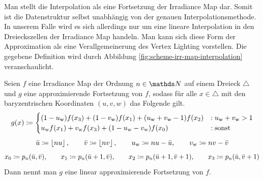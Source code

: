 		Man stellt die Interpolation als eine Fortsetzung der Irradiance Map dar.
		Somit ist die Datenstruktur selbst unabhängig von der genauen Interpolationsmethode.
		In unserem Falle wird es sich allerdings nur um eine lineare Interpolation in den Dreieckszellen der Irradiance Map handeln.
		Man kann sich diese Form der Approximation als eine Verallgemeinerung des Vertex Lighting vorstellen.
		Die gegebene Definition wird durch Abbildung \ref{fig:scheme-irr-map-interpolation} veranschaulicht.
		\begin{definition}
			Seien $f$ eine Irradiance Map der Ordnung $n\in\SN$ auf einem Dreieck $\triangle$ und $g$ eine approximierende Fortsetzung von $f$, sodass für alle $x\in\triangle$ mit den baryzentrischen Koordinaten $(u,v,w)$ das Folgende gilt.
			\[
				g(x) \coloneqq
				\begin{cases}
					(1-u_{\mathrm{w}})f(x_3) + (1-v_{\mathrm{w}})f(x_1) + (u_{\mathrm{w}} + v_{\mathrm{w}} - 1)f(x_2) &: u_{\mathrm{w}} + v_{\mathrm{w}} > 1 \\
					u_{\mathrm{w}} f(x_1) + v_{\mathrm{w}}f(x_3) + (1-u_{\mathrm{w}}-v_{\mathrm{w}})f(x_0) &: \mathrm{sonst}
				\end{cases}
			\]
			\[
				\bar{u}\coloneqq \left\lfloor nu \right\rfloor,\qquad \bar{v}\coloneqq \left\lfloor nv \right\rfloor,\qquad u_{\mathrm{w}}\coloneqq nu - \bar{u},\qquad v_{\mathrm{w}}\coloneqq nv - \bar{v}
			\]
			\[
				x_0 \coloneqq p_n(\bar{u},\bar{v}),\qquad x_1\coloneqq p_n(\bar{u}+1,\bar{v}),\qquad x_2\coloneqq p_n(\bar{u}+1,\bar{v}+1),\qquad x_3\coloneqq p_n(\bar{u},\bar{v}+1)
			\]
			Dann nennt man $g$ eine linear approximierende Fortsetzung von $f$.
		\end{definition}

